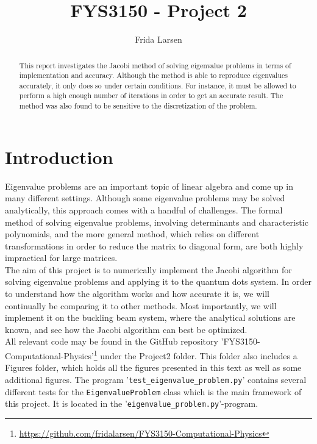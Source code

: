 \documentclass[notitlepage, reprint, nofootinbib]{revtex4-1}
\begin{document}
\title{FYS3150 - Project 2}
\author{Frida Larsen}

\begin{abstract}
This report investigates the Jacobi method of solving eigenvalue problems in terms of implementation and accuracy. Although the method is able to reproduce eigenvalues accurately, it only does so under certain conditions. For instance, it must be allowed to perform a high enough number of iterations in order to get an accurate result. The method was also found to be sensitive to the discretization of the problem.
\end{abstract}

\maketitle

\section{Introduction} 
Eigenvalue problems are an important topic of linear algebra and come up in many different settings. Although some eigenvalue problems may be solved analytically, this approach comes with a handful of challenges. The formal method of solving eigenvalue problems, involving determinants and characteristic polynomials,  and the more general method, which relies on different transformations in order to reduce the matrix to diagonal form, are both highly impractical for large matrices.\\[2mm]
The aim of this project is to numerically implement the Jacobi algorithm for solving eigenvalue problems and applying it to the quantum dots system. In order to understand how the algorithm works and how accurate it is, we will continually be comparing it to other methods. Most importantly, we will implement it on the buckling beam system, where the analytical solutions are known, and see how the Jacobi algorithm can best be optimized.\\[2mm]
All relevant code may be found in the GitHub repository 'FYS3150-Computational-Physics'\footnote{\href{GitHub Repository}{https://github.com/fridalarsen/FYS3150-Computational-Physics}} under the Project2 folder. This folder also includes a Figures folder, which holds all the figures presented in this text as well as some additional figures. The program '\texttt{test\_eigenvalue\_problem.py}' contains several different tests for the \texttt{EigenvalueProblem} class which is the main framework of this project. It is located in the '\texttt{eigenvalue\_problem.py}'-program. 
\newpage
\end{document}
